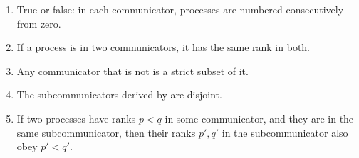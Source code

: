 \begin{enumerate}

\item True or false: in each communicator, processes are numbered consecutively from zero.

\item If a process is in two communicators, it has the same rank in
both.

\item Any communicator that is not  is a strict subset of it.

\item The subcommunicators derived by 
  are disjoint.

\item If two processes have ranks $p<q$ in some communicator,
  and they are in the same subcommunicator,
  then their ranks $p',q'$ in the subcommunicator also obey $p'<q'$.
\end{enumerate}




